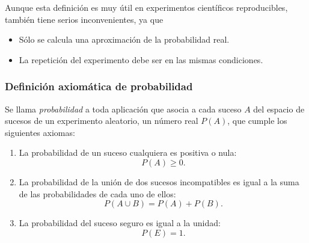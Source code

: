 \begin{frame}
{Aunque esta definición es muy útil en experimentos científicos reproducibles, también tiene serios inconvenientes, ya que
\begin{itemize}
\item Sólo se calcula una aproximación de la probabilidad real.
\item La repetición del experimento debe ser en las mismas condiciones.  
\end{itemize}
}
\end{frame}


\begin{frame}
\frametitle{Definición axiomática de probabilidad}
\begin{definicion}[Kolmogórov]
Se llama \emph{probabilidad} a toda aplicación que asocia a cada suceso $A$ del espacio de sucesos de un experimento aleatorio, un número
real $P(A)$, que cumple los siguientes axiomas:
\begin{enumerate}
\item La probabilidad de un suceso cualquiera es positiva o nula: \[P(A)\geq 0.\]
\item La probabilidad de la unión de dos sucesos incompatibles es igual a la suma de las probabilidades de cada uno de ellos:       
\[P(A\cup B) = P(A)+P(B).\]
\item La probabilidad del suceso seguro es igual a la unidad: 
\[P(E)=1.\]
\end{enumerate}
\end{definicion}

\end{frame}


